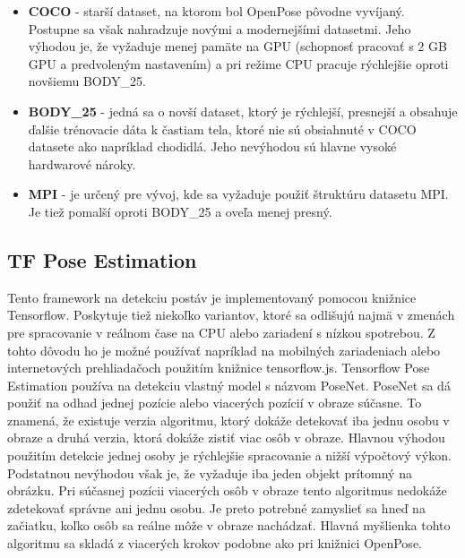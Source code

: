 \documentclass[slovak,master,dept460,male,cpp,cpdeclaration]{diploma}
\begin{document}
\begin{itemize}
\item \textbf{COCO} - starší dataset, na ktorom bol OpenPose pôvodne vyvíjaný. Postupne sa však nahradzuje novými a modernejšími datasetmi. Jeho výhodou je, že vyžaduje menej pamäte na GPU (schopnosť pracovať s 2 GB GPU a predvoleným nastavením) a pri režime CPU pracuje rýchlejšie oproti novšiemu BODY\_25.

\item \textbf{BODY\_25} - jedná sa o novší dataset, ktorý je rýchlejší, presnejší a obsahuje ďalšie trénovacie dáta k častiam tela, ktoré nie sú obsiahnuté v COCO datasete ako napríklad chodidlá. Jeho nevýhodou sú hlavne vysoké hardwarové nároky.

\item \textbf{MPI} - je určený pre vývoj, kde sa vyžaduje použiť štruktúru datasetu MPI. Je tiež pomalší oproti BODY\_25 a oveľa menej presný.
\end{itemize}


\newpage
\subsection{TF Pose Estimation}
Tento framework na detekciu postáv je implementovaný pomocou knižnice Tensorflow. Poskytuje tiež niekoľko variantov, ktoré sa odlišujú najmä v zmenách pre spracovanie v reálnom čase na CPU alebo zariadení s nízkou spotrebou. Z tohto dôvodu ho je  možné používať napríklad na mobilných zariadeniach alebo internetových prehliadačoch použitím knižnice tensorflow.js. Tensorflow Pose Estimation používa na detekciu  vlastný model s názvom PoseNet. PoseNet sa dá použiť na odhad jednej pozície alebo viacerých pozícií v obraze súčasne. To znamená, že existuje verzia algoritmu, ktorý dokáže detekovať iba jednu osobu v obraze a druhá verzia, ktorá dokáže zistiť viac osôb v obraze. Hlavnou výhodou použitím detekcie jednej osoby je rýchlejšie spracovanie a nižší výpočtový výkon. Podstatnou nevýhodou však je, že vyžaduje iba jeden objekt prítomný na obrázku. Pri súčasnej pozícii viacerých osôb v obraze tento algoritmus nedokáže zdetekovať správne ani jednu osobu. Je preto potrebné zamyslieť sa  hneď na začiatku, koľko osôb sa reálne môže v obraze nachádzať. Hlavná myšlienka tohto algoritmu sa skladá z viacerých krokov podobne ako pri knižnici OpenPose.
\end{document}
